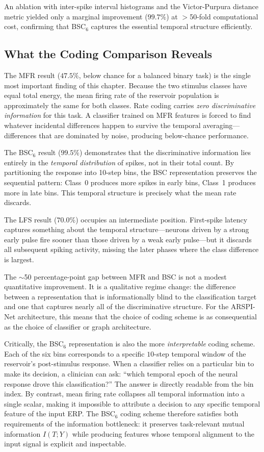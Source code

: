An ablation with inter-spike interval histograms and the Victor-Purpura distance metric \cite{victor_purpura_1996} yielded only a marginal improvement ($99.7\%$) at $>$50-fold computational cost, confirming that BSC$_6$ captures the essential temporal structure efficiently.

\subsection{What the Coding Comparison Reveals}

The MFR result ($47.5\%$, below chance for a balanced binary task) is the single most important finding of this chapter. Because the two stimulus classes have equal total energy, the mean firing rate of the reservoir population is approximately the same for both classes. Rate coding carries \emph{zero discriminative information} for this task. A classifier trained on MFR features is forced to find whatever incidental differences happen to survive the temporal averaging---differences that are dominated by noise, producing below-chance performance.

The BSC$_6$ result ($99.5\%$) demonstrates that the discriminative information lies entirely in the \emph{temporal distribution} of spikes, not in their total count. By partitioning the response into 10-step bins, the BSC representation preserves the sequential pattern: Class~0 produces more spikes in early bins, Class~1 produces more in late bins. This temporal structure is precisely what the mean rate discards.

The LFS result ($70.0\%$) occupies an intermediate position. First-spike latency captures something about the temporal structure---neurons driven by a strong early pulse fire sooner than those driven by a weak early pulse---but it discards all subsequent spiking activity, missing the later phases where the class difference is largest.

The $\sim$50 percentage-point gap between MFR and BSC is not a modest quantitative improvement. It is a qualitative regime change: the difference between a representation that is informationally blind to the classification target and one that captures nearly all of the discriminative structure. For the ARSPI-Net architecture, this means that the choice of coding scheme is as consequential as the choice of classifier or graph architecture.

Critically, the BSC$_6$ representation is also the more \emph{interpretable} coding scheme. Each of the six bins corresponds to a specific $10$-step temporal window of the reservoir's post-stimulus response. When a classifier relies on a particular bin to make its decision, a clinician can ask: ``which temporal epoch of the neural response drove this classification?'' The answer is directly readable from the bin index. By contrast, mean firing rate collapses all temporal information into a single scalar, making it impossible to attribute a decision to any specific temporal feature of the input ERP. The BSC$_6$ coding scheme therefore satisfies both requirements of the information bottleneck: it preserves task-relevant mutual information $I(T; Y)$ while producing features whose temporal alignment to the input signal is explicit and inspectable.


